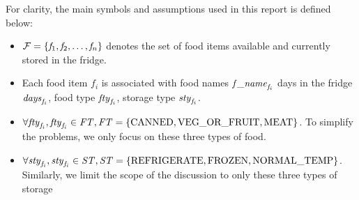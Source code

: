 For clarity, the main symbols and assumptions used in this report is defined below:

\begin{itemize}
    \item $\mathcal{F} = \{ \mathit{f}_1, \mathit{f}_2, \dots, \mathit{f}_n\}$ denotes the set of food items available and currently stored in the fridge.
    \item Each food item $f_i$ is associated with food names $\mathit{f\_name}_{\mathit{f}_i}$ days in the fridge $\mathit{days}_{\mathit{f}_i}$, food type $\mathit{fty}_{\mathit{f}_i}$, storage type $\mathit{sty}_{\mathit{f}_i}$.
    \item $\forall \mathit{fty}_{\mathit{f}_i}, \mathit{fty}_{\mathit{f}_i}\in \mathit{FT}, \mathit{FT} = \{ \text{CANNED}, \text{VEG\_OR\_FRUIT}, \text{MEAT} \}$. To simplify the problems, we only focus on these three types of food.
    \item $\forall \mathit{sty}_{\mathit{f}_i}, \mathit{sty}_{\mathit{f}_i}\in \mathit{ST}, \mathit{ST} = \{ \text{REFRIGERATE}, \text{FROZEN}, \text{NORMAL\_TEMP} \}$. Similarly, we limit the scope of the discussion to only these three types of storage
\end{itemize}